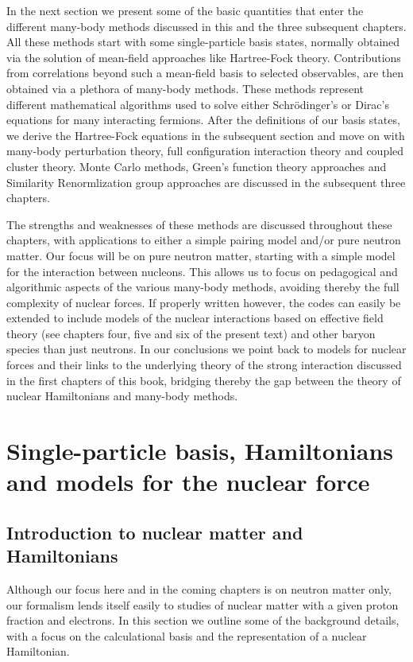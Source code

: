 In the next section we present some of the basic quantities that enter
the different many-body methods discussed in this and the three
subsequent chapters. All these methods start with some single-particle
basis states, normally obtained via the solution of mean-field
approaches like Hartree-Fock theory. Contributions from correlations
beyond such a mean-field basis to selected observables, are then
obtained via a plethora of many-body methods. These methods represent
different mathematical algorithms used to solve either
Schr\"{o}dinger's or Dirac's equations for many interacting
fermions. After the definitions of our basis states, we derive the
Hartree-Fock equations in the subsequent section and move on with
many-body perturbation theory, full configuration interaction theory
and coupled cluster theory.  Monte Carlo methods, Green's function
theory approaches and Similarity Renormlization group approaches are
discussed in the subsequent three chapters.

The strengths and weaknesses of these methods are discussed throughout
these chapters, with applications to either a simple pairing model
and/or pure neutron matter. Our focus will be on pure neutron matter,
starting with a simple model for the interaction between
nucleons. This allows us to focus on pedagogical and algorithmic
aspects of the various many-body methods, avoiding thereby the full
complexity of nuclear forces.  If properly written however, the codes
can easily be extended to include models of the nuclear interactions
based on effective field theory (see chapters four, five and six of
the present text) and other baryon species than just neutrons. In our
conclusions we point back to models for nuclear forces and their links
to the underlying theory of the strong interaction discussed in the
first chapters of this book, bridging thereby the gap between the
theory of nuclear Hamiltonians and many-body methods.


\section{Single-particle basis, Hamiltonians and models for the nuclear force}

\subsection{Introduction to nuclear matter and Hamiltonians}

Although our focus here and in the coming chapters is on neutron
matter only, our formalism lends itself easily to studies of nuclear
matter with a given proton fraction and electrons. In this section we
outline some of the background details, with a focus on the
calculational basis and the representation of a nuclear Hamiltonian.

